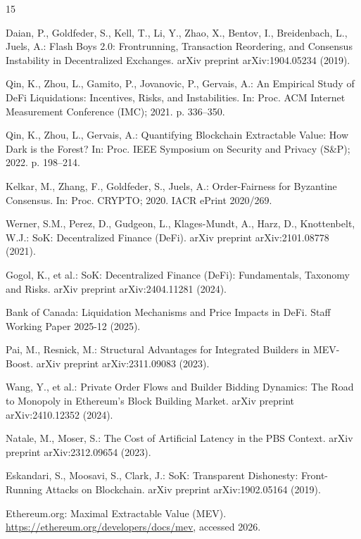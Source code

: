 \documentclass[conference]{IEEEtran}
\begin{document}
\begin{thebibliography}{15}

Daian, P., Goldfeder, S., Kell, T., Li, Y., Zhao, X., Bentov, I.,
Breidenbach, L., Juels, A.: Flash Boys 2.0: Frontrunning, Transaction
Reordering, and Consensus Instability in Decentralized Exchanges. arXiv
preprint arXiv:1904.05234 (2019).

Qin, K., Zhou, L., Gamito, P., Jovanovic, P., Gervais, A.: An Empirical
Study of DeFi Liquidations: Incentives, Risks, and Instabilities. In:
Proc. ACM Internet Measurement Conference (IMC); 2021. p. 336--350.

Qin, K., Zhou, L., Gervais, A.: Quantifying Blockchain Extractable
Value: How Dark is the Forest? In: Proc. IEEE Symposium on Security and
Privacy (S\&P); 2022. p. 198--214.

Kelkar, M., Zhang, F., Goldfeder, S., Juels, A.: Order-Fairness for
Byzantine Consensus. In: Proc. CRYPTO; 2020. IACR ePrint 2020/269.

Werner, S.M., Perez, D., Gudgeon, L., Klages-Mundt, A., Harz, D.,
Knottenbelt, W.J.: SoK: Decentralized Finance (DeFi). arXiv preprint
arXiv:2101.08778 (2021).

Gogol, K., et al.: SoK: Decentralized Finance (DeFi): Fundamentals,
Taxonomy and Risks. arXiv preprint arXiv:2404.11281 (2024).

Bank of Canada: Liquidation Mechanisms and Price Impacts in DeFi. Staff
Working Paper 2025-12 (2025).

Pai, M., Resnick, M.: Structural Advantages for Integrated Builders in
MEV-Boost. arXiv preprint arXiv:2311.09083 (2023).

Wang, Y., et al.: Private Order Flows and Builder Bidding Dynamics: The
Road to Monopoly in Ethereum's Block Building Market. arXiv preprint
arXiv:2410.12352 (2024).

Natale, M., Moser, S.: The Cost of Artificial Latency in the PBS
Context. arXiv preprint arXiv:2312.09654 (2023).

Eskandari, S., Moosavi, S., Clark, J.: SoK: Transparent Dishonesty:
Front-Running Attacks on Blockchain. arXiv preprint arXiv:1902.05164
(2019).

Ethereum.org: Maximal Extractable Value (MEV).
\url{https://ethereum.org/developers/docs/mev}, accessed 2026.


\end{thebibliography}
\end{document}
